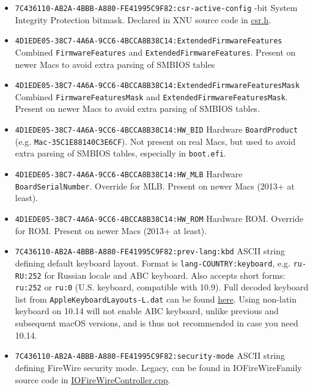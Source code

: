 \documentclass[]{article}
\providecommand{\tightlist}{%
  \setlength{\itemsep}{0pt}\setlength{\parskip}{0pt}}
\begin{document}
\begin{itemize}
\tightlist
\item
  \texttt{7C436110-AB2A-4BBB-A880-FE41995C9F82:csr-active-config}
  -bit System Integrity Protection bitmask. Declared in XNU source code in
  \href{https://opensource.apple.com/source/xnu/xnu-4570.71.2/bsd/sys/csr.h.auto.html}{csr.h}.
\item
  \texttt{4D1EDE05-38C7-4A6A-9CC6-4BCCA8B38C14:ExtendedFirmwareFeatures}
  \break
  Combined \texttt{FirmwareFeatures} and \texttt{ExtendedFirmwareFeatures}. Present on
  newer Macs to avoid extra parsing of SMBIOS tables
\item
  \texttt{4D1EDE05-38C7-4A6A-9CC6-4BCCA8B38C14:ExtendedFirmwareFeaturesMask}
  \break
  Combined \texttt{FirmwareFeaturesMask} and \texttt{ExtendedFirmwareFeaturesMask}.
  Present on newer Macs to avoid extra parsing of SMBIOS tables.
\item
  \texttt{4D1EDE05-38C7-4A6A-9CC6-4BCCA8B38C14:HW\_BID}
  \break
  Hardware \texttt{BoardProduct} (e.g. \texttt{Mac-35C1E88140C3E6CF}). Not present on
  real Macs, but used to avoid extra parsing of SMBIOS tables, especially in \texttt{boot.efi}.
\item
  \texttt{4D1EDE05-38C7-4A6A-9CC6-4BCCA8B38C14:HW\_MLB}
  \break
  Hardware \texttt{BoardSerialNumber}. Override for MLB. Present on newer Macs (2013+ at least).
\item
  \texttt{4D1EDE05-38C7-4A6A-9CC6-4BCCA8B38C14:HW\_ROM}
  \break
  Hardware ROM. Override for ROM. Present on newer Macs (2013+ at least).
\item
  \texttt{7C436110-AB2A-4BBB-A880-FE41995C9F82:prev-lang:kbd}
  \break
  ASCII string defining default keyboard layout. Format is \texttt{lang-COUNTRY:keyboard},
  e.g. \texttt{ru-RU:252} for Russian locale and ABC keyboard. Also accepts short forms:
  \texttt{ru:252} or \texttt{ru:0} (U.S. keyboard, compatible with 10.9). Full decoded
  keyboard list from \texttt{AppleKeyboardLayouts-L.dat} can be found
  \href{https://github.com/acidanthera/OpenCorePkg/tree/master/Utilities/AppleKeyboardLayouts}{here}. Using non-latin keyboard on 10.14
  will not enable ABC keyboard, unlike previous and subsequent macOS versions, and is thus not recommended in case you need 10.14.
\item
  \texttt{7C436110-AB2A-4BBB-A880-FE41995C9F82:security-mode}
  \break
  ASCII string defining FireWire security mode. Legacy, can be found in IOFireWireFamily
  source code in
  \href{https://opensource.apple.com/source/IOFireWireFamily/IOFireWireFamily-473/IOFireWireFamily.kmodproj/IOFireWireController.cpp.auto.html}{IOFireWireController.cpp}.

\end{itemize}
\end{document}
